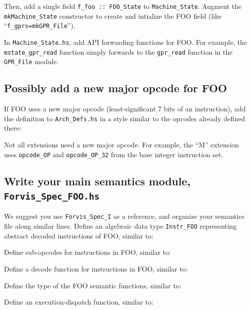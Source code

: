 \documentclass[11pt]{article}
\begin{document}
Then, add a single field \verb|f_foo :: FOO_State| to
\verb|Machine_State|.  Augment the \verb|mkMachine_State| constructor
to create and intialize the FOO field (like
``\verb|f_gprs=mkGPR_File|'').

In \verb|Machine_State.hs|, add API forwarding functions for FOO.  For
example, the \verb|mstate_gpr_read| function simply forwards to the
\verb|gpr_read| function in the \verb|GPR_File| module.


\subsection{Possibly add a new major opcode for FOO}

If FOO uses a new major opcode (least-significant 7 bits of an
instruction), add the definition to \verb|Arch_Defs.hs| in a style
similar to the opcodes already defined there:



Not all extensions need a new major opcode.  For example, the ``M''
extension uses \verb|opcode_OP| and \verb|opcode_OP_32| from the base
integer instruction set.


\subsection{Write your main semantics module, {\tt Forvis\_Spec\_FOO.hs}}

We suggest you use \verb|Forvis_Spec_I| as a reference, and organize
your semantics file along similar lines.  Define an algebraic data
type \verb|Instr_FOO| representing abstract decoded instructions of
FOO, similar to:



Define sub-opcodes for instructions in FOO, similar to:



Define a decode function for instructions in FOO, similar to:



Define the type of the FOO semantic functions, similar to:



Define an execution-dispatch function, similar to:
\end{document}
